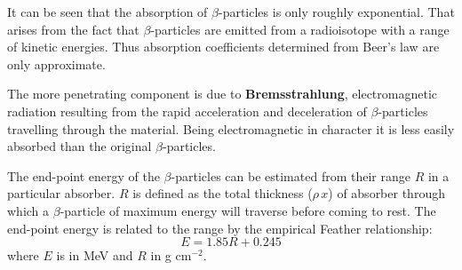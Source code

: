 It can be seen that the absorption of $\beta$-particles is only roughly exponential. That arises from the fact that $\beta$-particles are emitted from a radioisotope with a range of kinetic energies. Thus absorption coefficients determined from Beer's law are only approximate.

The more penetrating component is due to \textbf{Bremsstrahlung}, electromagnetic radiation resulting from the rapid acceleration and deceleration of $\beta$-particles travelling through the material. Being electromagnetic in character it is less easily absorbed than the original $\beta$-particles.

The end-point energy of the $\beta$-particles can be estimated from their range $R$ in a particular absorber. $R$ is defined as the total thickness ($\rho \, x$) of absorber through which a $\beta$-particle of maximum energy will traverse before coming to rest. The end-point energy is related to the range by the empirical Feather relationship:
\begin{displaymath}
E = 1.85R + 0.245
\end{displaymath}
where $E$ is in MeV and $R$ in g cm$^{-2}$.